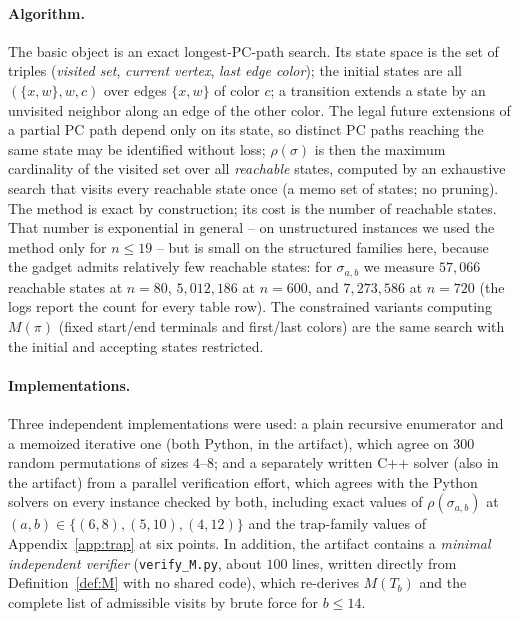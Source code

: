 \documentclass[11pt]{article}
\theoremstyle{definition}
\begin{document}
\paragraph{Algorithm.} The basic object is an exact longest-PC-path search. Its state
space is the set of triples (\emph{visited set}, \emph{current vertex}, \emph{last edge
color}); the initial states are all $(\{x, w\}, w, c)$ over edges $\{x, w\}$ of color
$c$; a transition extends a state by an unvisited neighbor along an edge of the other
color. The legal future extensions of a partial PC path depend only on its state, so
distinct PC paths reaching the same state may be identified without loss; $\rho(\sigma)$
is then the maximum cardinality of the visited set over all \emph{reachable} states,
computed by an exhaustive search that visits every reachable state once (a memo set of
states; no pruning). The method is exact by construction; its cost is the number of
reachable states. That number is exponential in general -- on unstructured instances we
used the method only for $n \le 19$ -- but is small on the structured families here,
because the gadget admits relatively few reachable states: for $\sigma_{a,b}$ we measure
$57{,}066$
reachable states at $n = 80$, $5{,}012{,}186$ at $n = 600$, and $7{,}273{,}586$ at
$n = 720$ (the logs report the count for every table row). The constrained variants
computing $M(\pi)$ (fixed start/end terminals and first/last colors) are the same search
with the initial and accepting states restricted.

\paragraph{Implementations.} Three independent implementations were used: a plain
recursive enumerator and a memoized iterative one (both Python, in the artifact), which
agree on $300$ random permutations of sizes $4$--$8$; and a separately written C++
solver (also in the artifact) from a parallel verification effort, which agrees with the
Python solvers on every instance checked by both, including exact values of
$\rho(\sigma_{a,b})$ at $(a,b) \in \{(6,8), (5,10), (4,12)\}$ and the trap-family values
of Appendix~\ref{app:trap} at six points. In addition, the artifact contains a
\emph{minimal independent verifier} (\texttt{verify\_M.py}, about $100$ lines, written
directly from Definition~\ref{def:M} with no shared code), which re-derives $M(T_b)$ and
the complete list of admissible visits by brute force for $b \le 14$.
\end{document}
